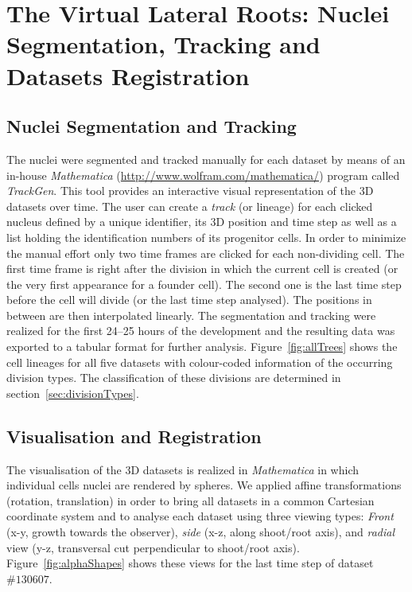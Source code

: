 \documentclass[11pt,a4paper, final]{article}
\begin{document}
\clearpage
\section{The Virtual Lateral Roots: Nuclei Segmentation, Tracking and Datasets Registration}

\subsection{Nuclei Segmentation and Tracking}
\label{sec:segmentation}
\noindent
The nuclei were segmented and tracked manually for each dataset by means of an in-house \textit{Mathematica} (\href{http://www.wolfram.com/mathematica/}{http://www.wolfram.com/mathematica/}) program called \textit{TrackGen}. This tool provides an interactive visual representation of the 3D datasets over time. The user can create a \textit{track} (or lineage) for each clicked nucleus defined by a unique identifier, its 3D position and time step as well as a list holding the identification numbers of its progenitor cells. In order to minimize the manual effort only two time frames are clicked for each non-dividing cell. The first time frame is right after the division in which the current cell is created (or the very first appearance for a founder cell). The second one is the last time step before the cell will divide (or the last time step analysed). The positions in between are then interpolated linearly. The segmentation and tracking were realized for the first 24--25 hours of the development and the resulting data was exported to a tabular format for further analysis. Figure~\ref{fig:allTrees} shows the cell lineages for all five datasets with colour-coded information of the occurring division types. The classification of these divisions are determined in section~\ref{sec:divisionTypes}.

\subsection{Visualisation and Registration}
\noindent
The visualisation of the 3D datasets is realized in \textit{Mathematica} in which individual cells nuclei are rendered by spheres. We applied affine transformations (rotation, translation) in order to bring all datasets in a common Cartesian coordinate system and to analyse each dataset using three viewing types: \textit{Front} (x-y, growth towards the observer), \textit{side} (x-z, along shoot/root axis), and \textit{radial} view (y-z, transversal cut perpendicular to shoot/root axis). Figure~\ref{fig:alphaShapes} shows these views for the last time step of dataset $\# 130607$.
\end{document}
